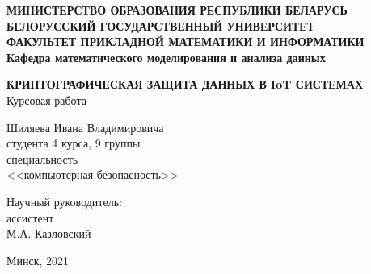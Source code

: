  
 \begin{titlepage}
 	 \begin{center}
 		\textbf{
 			\small{МИНИСТЕРСТВО ОБРАЗОВАНИЯ РЕСПУБЛИКИ БЕЛАРУСЬ}\\
 			\vspace{0.5em}
 			\small{БЕЛОРУССКИЙ ГОСУДАРСТВЕННЫЙ УНИВЕРСИТЕТ}\\
 			\vspace{0.5em}
 			\small{ФАКУЛЬТЕТ ПРИКЛАДНОЙ МАТЕМАТИКИ И ИНФОРМАТИКИ}\\
 			\vspace{0.5em}
 			Кафедра математического моделирования и анализа данных\\
 		}
 	\end{center}
 	
 	\vspace{7em}
 	
 	\begin{center}
 		{\bf КРИПТОГРАФИЧЕСКАЯ ЗАЩИТА ДАННЫХ В IoT СИСТЕМАХ} \\
 		\vspace{5mm}
 		{Курсовая работа}
 	\end{center}
 	
 	\vspace{8em}
 	
 	\begin{flushright}
 		Шиляева Ивана Владимировича\\
 		студента 4 курса, 9 группы\\
 		специальность\\
 		<<компьютерная безопасность>>
 	\end{flushright}
 	
 	\begin{flushright}
 		Научный руководитель:\\
 		ассистент\\
 		М.А. Казловский\\
 	\end{flushright}
 	
 	\vfill
 	
 	\begin{center}
 		{Минск, 2021}
 	\end{center}
 \end{titlepage}